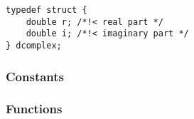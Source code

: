\begin{verbatim}
typedef struct {
    double r; /*!< real part */
    double i; /*!< imaginary part */
} dcomplex;
\end{verbatim}


\subsubsection{Constants}

\begin{describeconst}
\end{describeconst}

\subsubsection{Functions}
